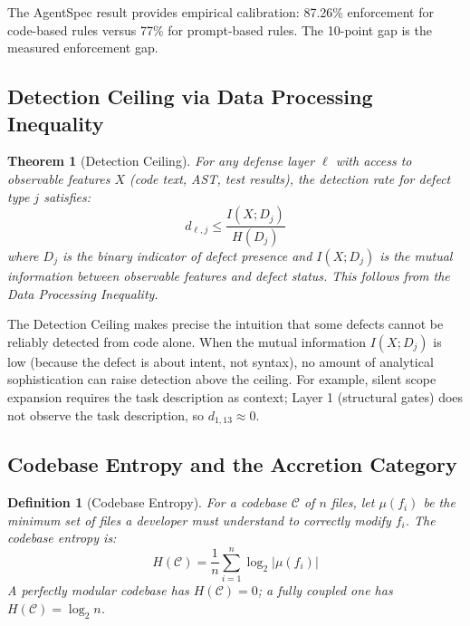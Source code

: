 \documentclass[11pt, a4paper, logo, copyright]{googledeepmind}
\newtheorem{definition}{Definition}[section]
\newtheorem{theorem}{Theorem}[section]
\begin{document}
The AgentSpec result \citep{wang2026agentspec} provides empirical calibration: 87.26\% enforcement for code-based rules versus 77\% for prompt-based rules. The 10-point gap is the measured enforcement gap.

\subsection{Detection Ceiling via Data Processing Inequality}

\begin{theorem}[Detection Ceiling]
\label{thm:detection-ceiling}
For any defense layer $\ell$ with access to observable features $X$ (code text, AST, test results), the detection rate for defect type $j$ satisfies:
\begin{equation}
    d_{\ell,j} \leq \frac{I(X; D_j)}{H(D_j)}
\end{equation}
where $D_j$ is the binary indicator of defect presence and $I(X; D_j)$ is the mutual information between observable features and defect status. This follows from the Data Processing Inequality.
\end{theorem}

The Detection Ceiling makes precise the intuition that some defects cannot be reliably detected from code alone. When the mutual information $I(X; D_j)$ is low (because the defect is about intent, not syntax), no amount of analytical sophistication can raise detection above the ceiling. For example, silent scope expansion requires the task description as context; Layer 1 (structural gates) does not observe the task description, so $d_{1,13} \approx 0$.

\subsection{Codebase Entropy and the Accretion Category}

\begin{definition}[Codebase Entropy]
\label{def:codebase-entropy}
For a codebase $\mathcal{C}$ of $n$ files, let $\mu(f_i)$ be the minimum set of files a developer must understand to correctly modify $f_i$. The codebase entropy is:
\begin{equation}
H(\mathcal{C}) = \frac{1}{n} \sum_{i=1}^{n} \log_2 |\mu(f_i)|
\end{equation}
A perfectly modular codebase has $H(\mathcal{C}) = 0$; a fully coupled one has $H(\mathcal{C}) = \log_2 n$.
\end{definition}
\end{document}
